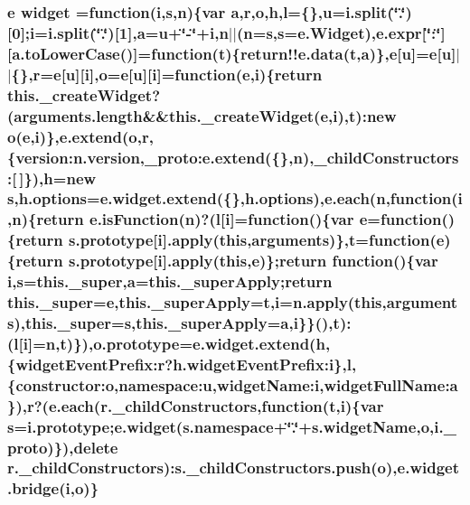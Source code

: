 \hypertarget{static_2root_2js_2jquery-ui_8custom_8min_8js_ada11821ba7802e380fc79337d4734d98}{
\subsubsection[{widget}]{ {\bf e} widget =function({\bf i},{\bf s},{\bf n})\{var {\bf a},{\bf r},{\bf o},{\bf h},{\bf l}=\{\},{\bf u}=i.\-split(\char`\"{}.\char`\"{})\mbox{[}0\mbox{]};{\bf i}=i.\-split(\char`\"{}.\char`\"{})\mbox{[}1\mbox{]},{\bf a}={\bf u}+\char`\"{}-\/\char`\"{}+{\bf i},{\bf n}$\vert$$\vert$({\bf n}={\bf s},{\bf s}={\bf e.\-Widget}),{\bf e.\-expr}\mbox{[}\char`\"{}\-:\char`\"{}\mbox{]}\mbox{[}a.\-to\-Lower\-Case()\mbox{]}=function({\bf t})\{{\bf return!!e.\-data}({\bf t},{\bf a})\},{\bf e}\mbox{[}{\bf u}\mbox{]}={\bf e}\mbox{[}{\bf u}\mbox{]}$\vert$$\vert$\{\},{\bf r}={\bf e}\mbox{[}{\bf u}\mbox{]}\mbox{[}{\bf i}\mbox{]},{\bf o}={\bf e}\mbox{[}{\bf u}\mbox{]}\mbox{[}{\bf i}\mbox{]}=function({\bf e},{\bf i})\{return this.\-\_\-create\-Widget?(arguments.\-length\&\&this.\-\_\-create\-Widget({\bf e},{\bf i}),{\bf t})\-:new {\bf o}({\bf e},{\bf i})\},{\bf e.\-extend}({\bf o},{\bf r},\{version\-:n.\-version,{\bf \-\_\-proto\-:e.\-extend}(\{\},{\bf n}),\-\_\-child\-Constructors\-:\mbox{[}$\,$\mbox{]}\}),{\bf h}=new {\bf s},h.\-options={\bf e.\-widget.\-extend}(\{\},h.\-options),{\bf e.\-each}({\bf n},function({\bf i},{\bf n})\{return e.\-is\-Function({\bf n})?({\bf l}\mbox{[}{\bf i}\mbox{]}=function()\{var {\bf e}=function()\{return {\bf s.\-prototype}\mbox{[}{\bf i}\mbox{]}.apply(this,arguments)\},{\bf t}=function({\bf e})\{return {\bf s.\-prototype}\mbox{[}{\bf i}\mbox{]}.apply(this,{\bf e})\};return function()\{var {\bf i},{\bf s}=this.\-\_\-super,{\bf a}=this.\-\_\-super\-Apply;return this.\-\_\-super={\bf e},this.\-\_\-super\-Apply={\bf t},{\bf i}=n.\-apply(this,arguments),this.\-\_\-super={\bf s},this.\-\_\-super\-Apply={\bf a},{\bf i}\}\}(),{\bf t})\-:({\bf l}\mbox{[}{\bf i}\mbox{]}={\bf n},{\bf t})\}),{\bf o.\-prototype}={\bf e.\-widget.\-extend}({\bf h},\{widget\-Event\-Prefix\-:r?h.\-widget\-Event\-Prefix\-:i\},{\bf l},\{constructor\-:o,namespace\-:u,widget\-Name\-:i,widget\-Full\-Name\-:a\}),{\bf r}?({\bf e.\-each}({\bf r.\-\_\-child\-Constructors},function({\bf t},{\bf i})\{var {\bf s}={\bf i.\-prototype};e.\-widget(s.\-namespace+\char`\"{}.\char`\"{}+s.\-widget\-Name,{\bf o},i.\-\_\-proto)\}),delete {\bf r.\-\_\-child\-Constructors})\-:s.\-\_\-child\-Constructors.\-push({\bf o}),{\bf e.\-widget.\-bridge}({\bf i},{\bf o})\}}}\label{static_2root_2js_2jquery-ui_8custom_8min_8js_ada11821ba7802e380fc79337d4734d98}
